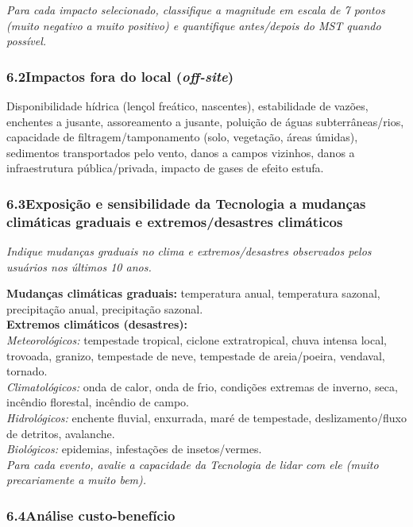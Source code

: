 \medskip\noindent
\textit{Para cada impacto selecionado, classifique a magnitude em escala de 7 pontos (muito negativo a muito positivo) e quantifique antes/depois do MST quando possível.}

\subsubsection*{6.2\quad Impactos fora do local (\textit{off-site})}

Disponibilidade hídrica (lençol freático, nascentes), estabilidade de vazões, enchentes a jusante, assoreamento a jusante, poluição de águas subterrâneas/rios, capacidade de filtragem/tamponamento (solo, vegetação, áreas úmidas), sedimentos transportados pelo vento, danos a campos vizinhos, danos a infraestrutura pública/privada, impacto de gases de efeito estufa.

\subsubsection*{6.3\quad Exposição e sensibilidade da Tecnologia a mudanças climáticas graduais e extremos/desastres climáticos}

\textit{Indique mudanças graduais no clima e extremos/desastres observados pelos usuários nos últimos 10 anos.}

\medskip\noindent
\textbf{Mudanças climáticas graduais:} temperatura anual, temperatura sazonal, precipitação anual, precipitação sazonal.\\[4pt]
\textbf{Extremos climáticos (desastres):}\\
\textit{Meteorológicos:} tempestade tropical, ciclone extratropical, chuva intensa local, trovoada, granizo, tempestade de neve, tempestade de areia/poeira, vendaval, tornado.\\
\textit{Climatológicos:} onda de calor, onda de frio, condições extremas de inverno, seca, incêndio florestal, incêndio de campo.\\
\textit{Hidrológicos:} enchente fluvial, enxurrada, maré de tempestade, deslizamento/fluxo de detritos, avalanche.\\
\textit{Biológicos:} epidemias, infestações de insetos/vermes.\\[4pt]
\textit{Para cada evento, avalie a capacidade da Tecnologia de lidar com ele (muito precariamente a muito bem).}

\subsubsection*{6.4\quad Análise custo-benefício}

